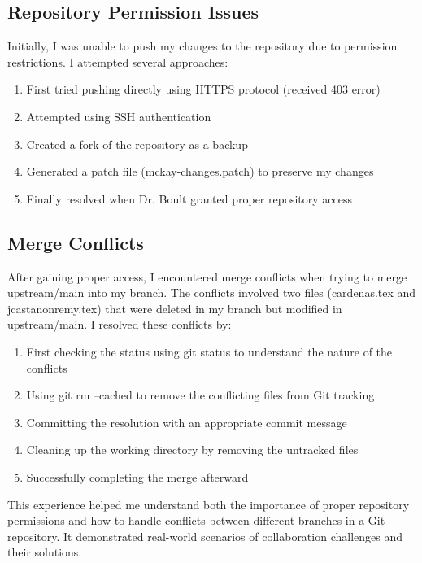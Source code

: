 \subsection{Repository Permission Issues}
Initially, I was unable to push my changes to the repository due to permission restrictions. I attempted several approaches:
\begin{enumerate}
    \item First tried pushing directly using HTTPS protocol (received 403 error)
    \item Attempted using SSH authentication
    \item Created a fork of the repository as a backup
    \item Generated a patch file (mckay-changes.patch) to preserve my changes
    \item Finally resolved when Dr. Boult granted proper repository access
\end{enumerate}

\subsection{Merge Conflicts}
After gaining proper access, I encountered merge conflicts when trying to merge upstream/main into my branch. 
The conflicts involved two files (cardenas.tex and jcastanonremy.tex) that were deleted in my branch 
but modified in upstream/main. I resolved these conflicts by:
\begin{enumerate}
    \item First checking the status using git status to understand the nature of the conflicts
    \item Using git rm --cached to remove the conflicting files from Git tracking
    \item Committing the resolution with an appropriate commit message
    \item Cleaning up the working directory by removing the untracked files
    \item Successfully completing the merge afterward
\end{enumerate}

This experience helped me understand both the importance of proper repository permissions and 
how to handle conflicts between different branches in a Git repository. It demonstrated 
real-world scenarios of collaboration challenges and their solutions.

